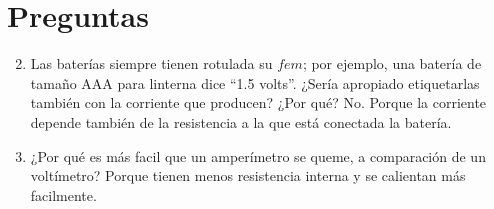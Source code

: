 \documentclass[../main.tex]{subfiles}
\begin{document}
\section{Preguntas}%
\label{sec:preguntas}

\thispagestyle{fancy}

\begin{enumerate}
	\setcounter{enumi}{1}
	\item Las baterías siempre tienen rotulada su $fem$; por ejemplo,
		una batería de tamaño AAA para linterna dice ``1.5 volts''.
		¿Sería apropiado etiquetarlas también con la corriente que producen?
		¿Por qué?
		\subitem No. Porque la corriente depende también de la resistencia a
			la que está conectada la batería.
	\item ¿Por qué es más facil que un amperímetro se queme,
		a comparación de un voltímetro?
		\subitem Porque tienen menos resistencia interna
			y se calientan más facilmente.
\end{enumerate}
\end{document}
